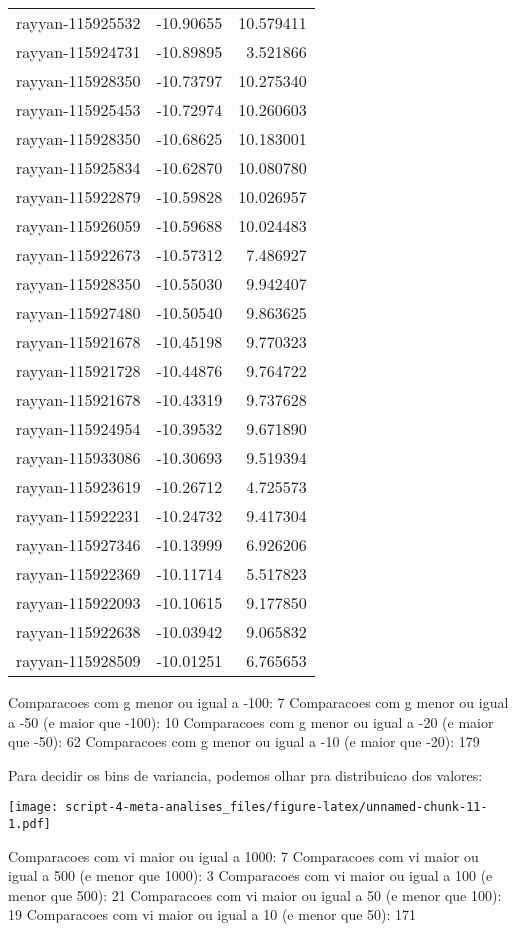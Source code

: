 \documentclass[
]{article}
\begin{document}
\begin{longtable}[]{@{}lrr@{}}
rayyan-115925532 & -10.90655 & 10.579411 \\
rayyan-115924731 & -10.89895 & 3.521866 \\
rayyan-115928350 & -10.73797 & 10.275340 \\
rayyan-115925453 & -10.72974 & 10.260603 \\
rayyan-115928350 & -10.68625 & 10.183001 \\
rayyan-115925834 & -10.62870 & 10.080780 \\
rayyan-115922879 & -10.59828 & 10.026957 \\
rayyan-115926059 & -10.59688 & 10.024483 \\
rayyan-115922673 & -10.57312 & 7.486927 \\
rayyan-115928350 & -10.55030 & 9.942407 \\
rayyan-115927480 & -10.50540 & 9.863625 \\
rayyan-115921678 & -10.45198 & 9.770323 \\
rayyan-115921728 & -10.44876 & 9.764722 \\
rayyan-115921678 & -10.43319 & 9.737628 \\
rayyan-115924954 & -10.39532 & 9.671890 \\
rayyan-115933086 & -10.30693 & 9.519394 \\
rayyan-115923619 & -10.26712 & 4.725573 \\
rayyan-115922231 & -10.24732 & 9.417304 \\
rayyan-115927346 & -10.13999 & 6.926206 \\
rayyan-115922369 & -10.11714 & 5.517823 \\
rayyan-115922093 & -10.10615 & 9.177850 \\
rayyan-115922638 & -10.03942 & 9.065832 \\
rayyan-115928509 & -10.01251 & 6.765653 \\
\bottomrule()
\end{longtable}

Comparacoes com g menor ou igual a -100: 7 Comparacoes com g menor ou
igual a -50 (e maior que -100): 10 Comparacoes com g menor ou igual a
-20 (e maior que -50): 62 Comparacoes com g menor ou igual a -10 (e
maior que -20): 179

Para decidir os bins de variancia, podemos olhar pra distribuicao dos
valores:

\texttt{[image: script-4-meta-analises\_files/figure-latex/unnamed-chunk-11-1.pdf]}

Comparacoes com vi maior ou igual a 1000: 7 Comparacoes com vi maior ou
igual a 500 (e menor que 1000): 3 Comparacoes com vi maior ou igual a
100 (e menor que 500): 21 Comparacoes com vi maior ou igual a 50 (e
menor que 100): 19 Comparacoes com vi maior ou igual a 10 (e menor que
50): 171
\end{document}
